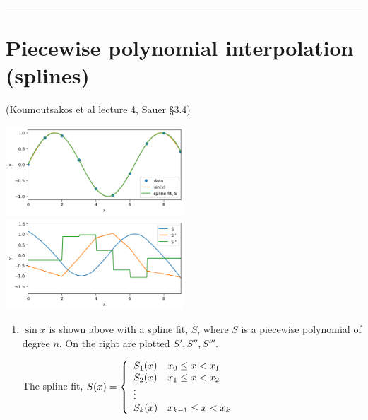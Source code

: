 \documentclass[12pt,letterpaper,noanswers]{exam}
\begin{document}
\vspace{0.2cm}
\hrule
\vspace{0.2cm}



\section*{Piecewise polynomial interpolation (splines)}

(Koumoutsakos et al lecture 4, Sauer \S 3.4)


\includegraphics[width=0.5\textwidth]{img/Class09sinspline.png}
\includegraphics[width=0.5\textwidth]{img/Class09deriv.png}

\begin{enumerate}[resume]
\item $\sin x$ is shown above with a spline fit, $S$, where $S$ is a piecewise polynomial of degree $n$.  On the right are plotted $S', S'',S'''$.  



The spline fit, $S(x) = \left\{\begin{array}{l l} S_1(x) & x_0\leq x < x_1 \\
S_2(x) & x_1\leq x < x_2 \\
\vdots \\
S_k(x) & x_{k-1}\leq x < x_k \\
\end{array}\right.$
\end{enumerate}
\end{document}
